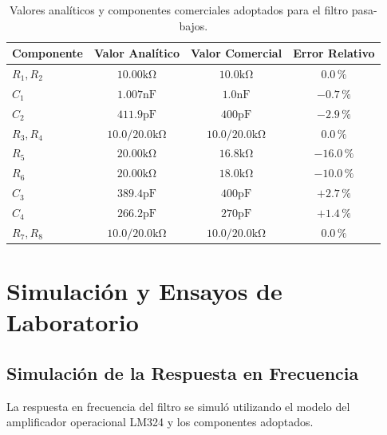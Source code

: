 \begin{table}[!ht]
    \centering
    \caption{Valores analíticos y componentes comerciales adoptados para el filtro pasa-bajos.}
    \label{tab.ej2:resumen_componentes}
    \begin{tabular}{lccc}
        \toprule
        \textbf{Componente} & \textbf{Valor Analítico} & \textbf{Valor Comercial} & \textbf{Error Relativo} \\
        \midrule
        $R_1, R_2$ & $10.00 \unit{\kilo\ohm}$  & $10.0 \unit{\kilo\ohm}$  & $0.0\,\%$ \\
        $C_1$      & $1.007 \unit{\nano\farad}$ & $1.0 \unit{\nano\farad}$ & $-0.7\,\%$ \\
        $C_2$      & $411.9 \unit{\pico\farad}$ & $400 \unit{\pico\farad}$ & $-2.9\,\%$ \\
        $R_3, R_4$ & $10.0 / 20.0 \unit{\kilo\ohm}$ & $10.0 / 20.0 \unit{\kilo\ohm}$ & $0.0\,\%$ \\
        \midrule
        $R_5$      & $20.00 \unit{\kilo\ohm}$  & $16.8 \unit{\kilo\ohm}$  & $-16.0\,\%$ \\
        $R_6$      & $20.00 \unit{\kilo\ohm}$  & $18.0 \unit{\kilo\ohm}$  & $-10.0\,\%$ \\
        $C_3$      & $389.4 \unit{\pico\farad}$ & $400 \unit{\pico\farad}$ & $+2.7\,\%$ \\
        $C_4$      & $266.2 \unit{\pico\farad}$ & $270 \unit{\pico\farad}$ & $+1.4\,\%$ \\
        $R_7, R_8$ & $10.0 / 20.0 \unit{\kilo\ohm}$ & $10.0 / 20.0 \unit{\kilo\ohm}$ & $0.0\,\%$ \\
        \bottomrule
    \end{tabular}
\end{table}

\section{Simulación y Ensayos de Laboratorio}

\subsection{Simulación de la Respuesta en Frecuencia}
La respuesta en frecuencia del filtro se simuló utilizando el modelo del amplificador operacional LM324 y los
componentes adoptados.


